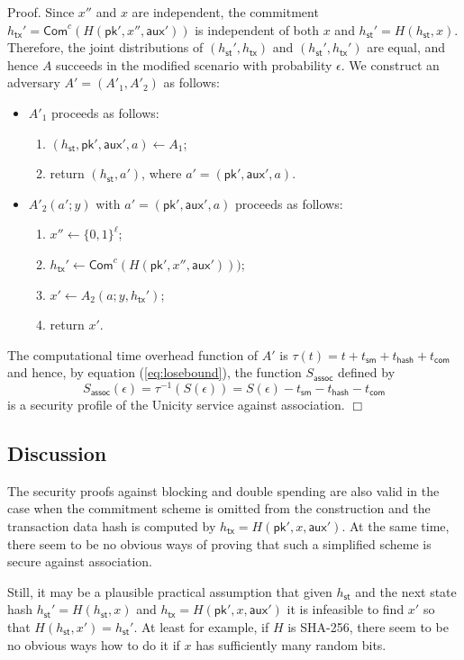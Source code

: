 \documentclass{article}
\newenvironment{proof}{\textsf{Proof}.}{\hfill$\Box$}
\newcommand{\pubkey}[0]{\mathsf{pk}}
\newcommand{\commitc}[0]{{\mathsf{Com}^{c}}}
\newcommand{\sthash}[0]{{h_\mathsf{st}}}
\newcommand{\txhash}[0]{{h_\mathsf{tx}}}
\newcommand{\auxd}[0]{\mathsf{aux}}
\begin{document}
\begin{proof}
Since $x''$ and $x$ are independent, the commitment $\txhash'=\commitc(H(\pubkey',x'',\auxd'))$ is independent of both $x$ and $\sthash'=H(\sthash,x)$. Therefore, the joint distributions of $(\sthash',\txhash)$ and $(\sthash',\txhash')$ are equal, and hence $A$ succeeds in the modified scenario with probability $\epsilon$. We construct an adversary $A'=(A'_1,A'_2)$ as follows:
\begin{itemize}
\item $A'_1$ proceeds as follows:
\begin{enumerate}
\item $(\sthash, \pubkey', \auxd', a)\gets A_1$;
\item return $(\sthash, a')$, where $a'=(\pubkey', \auxd', a)$.
\end{enumerate}
\item $A'_2(a';y)$ with $a'=(\pubkey', \auxd', a)$ proceeds as follows:
\begin{enumerate}
\item $x''\gets \{0,1\}^\ell$;
\item $\txhash'\gets\commitc(H(\pubkey',x'',\auxd')))$;
\item $x'\gets A_2(a; y,\txhash')$;
\item return $x'$.
\end{enumerate}
\end{itemize}

\noindent The computational time overhead function of $A'$ is $\tau(t) = t + t_\mathsf{sm} + t_\mathsf{hash} + t_\mathsf{com}$ and hence, by equation (\ref{eq:losebound}), the function $S_\mathsf{assoc}$ defined by
\[
S_\mathsf{assoc}(\epsilon) = \tau^{-1}(S(\epsilon)) = S(\epsilon) - t_\mathsf{sm} - t_\mathsf{hash} - t_\mathsf{com}
\]
is a security profile of the Unicity service against association.
\end{proof}

\subsection{Discussion}

The security proofs against blocking and double spending are also valid in the case when the commitment scheme is omitted from the construction and the transaction data hash is computed by $\txhash = H(\pubkey',x,\auxd')$.
At the same time, there seem to be no obvious ways of proving that such a simplified scheme is secure against association.

Still, it may be a plausible practical assumption that given $\sthash$ and the next state hash $\sthash'=H(\sthash,x)$ and $\txhash = H(\pubkey',x,\auxd')$ it is infeasible to find $x'$ so that $H(\sthash,x')=\sthash'$. At least for example, if $H$ is \textsf{SHA-256}, there seem to be no obvious ways how to do it if $x$ has sufficiently many random bits.
\end{document}
